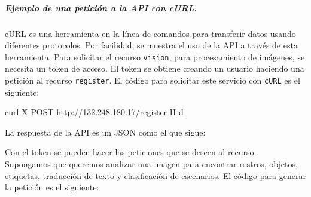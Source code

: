 \subparagraph{Ejemplo de una petición a la API con cURL.}

cURL es una herramienta en la línea de comandos para transferir
datos usando diferentes protocolos. Por facilidad,
se muestra el uso de la API a través de esta herramienta.
Para solicitar el recurso \texttt{vision}, para procesamiento de imágenes,  se necesita un token de acceso. El token
se obtiene creando un usuario haciendo una petición al recurso
\texttt{register}. El código para solicitar este servicio con
\texttt{cURL} es el siguiente:

%
\begin{sphinxVerbatim}[commandchars=\\\{\}]
curl \PYGZhy{}X POST 
http://132.248.180.17/register 
\PYGZhy{}H 
\PYGZhy{}d 
\end{sphinxVerbatim}

La respuesta de la API es un JSON como el que sigue:

%
\begin{sphinxVerbatim}[commandchars=\\\{\}]
     
     
\end{sphinxVerbatim}

Con el token se pueden hacer las peticiones que se deseen al recurso
. Supongamos que queremos analizar una imagen para encontrar rostros, objetos, etiquetas, traducción 
de texto y clasificación de escenarios. El código para generar la 
petición es el siguiente:

